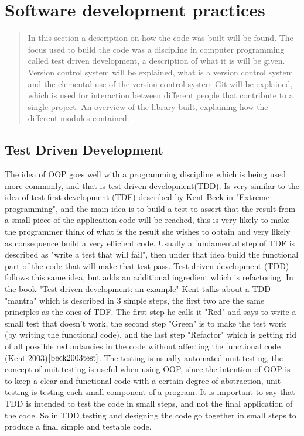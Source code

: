 \documentclass{article}
\begin{document}
\newpage
\section{Software development practices}
\maketitle
\begin{abstract}
In this section a description on how the code was built will be found. The focus used to build the code was a discipline in computer programming called test driven development, a description of what it is will be given. Version control system will be explained, what is a version control system and the elemental use of the version control system Git will be explained, which is used for interaction between different people that contribute to a single project. An overview of the library built, explaining how the different modules contained.

\end{abstract}


\subsection{Test Driven Development}
The idea of OOP goes well with a programming discipline which is being used more commonly, and that is test-driven development(TDD). Is very similar to the idea of test first development (TDF) described by Kent Beck in "Extreme programming", and the main idea is to build a test to assert that the result from a small piece of the application code will be reached, this is very likely to make the programmer think of what is the result she wishes to obtain and very likely as consequence build a very efficient code. Usually a fundamental  step of TDF is described as "write a test that will fail", then under that idea build the functional part of the code that will make that test pass. Test driven development (TDD) follows this same idea, but adds an additional ingredient which is refactoring. In the book "Test-driven development: an example" Kent talks about a TDD "mantra" which is described in 3 simple steps, the first two are the same principles as the ones of TDF. The first step he calls it "Red" and says to write a small test that doesn't work, the second step "Green" is to make the test work (by writing the functional code), and the last step "Refactor" which is getting rid of all possible redundancies in the code without affecting the functional code (Kent 2003)$\cite{beck2003test}$. The testing is usually automated unit testing, the concept of unit testing is useful when using OOP, since the intention of OOP is to keep a clear and functional code with a certain degree of abstraction, unit testing is testing each small component of a program. It is important to say that TDD is intended to test the code in small steps, and not the final application of the code. So in TDD testing and designing the code go together in small steps to produce a final simple and testable code. 
\end{document}
